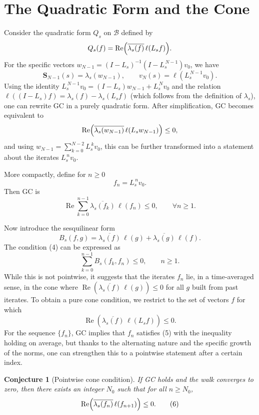 \documentclass[11pt,a4paper]{article}
\newtheorem{conjecture}[theorem]{Conjecture}
\newcommand{\RE}{\operatorname{Re}}
\begin{document}
\section{The Quadratic Form and the Cone}
Consider the quadratic form \(Q_s\) on \(\mathcal{B}\) defined by
\[
Q_s(f) = \RE\Bigl( \overline{ \lambda_s(f) } \, \ell( L_s f ) \Bigr).
\]
For the specific vectors \(w_{N-1} = (I - L_s)^{-1} (I - L_s^{\,N-1}) v_0\), we have
\[
\mathbf{S}_{N-1}(s) = \lambda_s( w_{N-1} ), \qquad v_N(s) = \ell( L_s^{\,N-1} v_0 ).
\]
Using the identity \(L_s^{\,N-1} v_0 = (I - L_s) w_{N-1} + L_s^{\,N} v_0\) and the relation \(\ell( (I - L_s) f ) = \lambda_s(f) - \lambda_s( L_s f )\) (which follows from the definition of \(\lambda_s\)), one can rewrite GC in a purely quadratic form.  After simplification, GC becomes equivalent to
\[
\RE\Bigl( \overline{ \lambda_s( w_{N-1} ) } \, \ell( L_s w_{N-1} ) \Bigr) \le 0,
\]
and using \(w_{N-1} = \sum_{k=0}^{N-2} L_s^{\,k} v_0\), this can be further transformed into a statement about the iterates \(L_s^{\,n} v_0\).

More compactly, define for \(n \ge 0\)
\[
f_n = L_s^{\,n} v_0.
\]
Then GC is
\[
\RE \sum_{k=0}^{n-1} \overline{ \lambda_s( f_k ) } \, \ell( f_n ) \le 0, \qquad \forall n \ge 1.
\tag{4}
\]

Now introduce the sesquilinear form
\[
B_s(f,g) = \overline{ \lambda_s(f) } \, \ell(g) + \overline{ \lambda_s(g) } \, \ell(f).
\]
The condition (4) can be expressed as
\[
\sum_{k=0}^{n-1} B_s( f_k, f_n ) \le 0, \qquad n \ge 1.
\]
While this is not pointwise, it suggests that the iterates \(f_n\) lie, in a time‑averaged sense, in the cone where \(\RE( \overline{\lambda_s(f)} \, \ell(g) ) \le 0\) for all \(g\) built from past iterates.  To obtain a pure cone condition, we restrict to the set of vectors \(f\) for which
\[
\RE( \overline{\lambda_s(f)} \, \ell( L_s f ) ) \le 0.
\tag{5}
\]
For the sequence \(\{f_n\}\), GC implies that \(f_n\) satisfies (5) with the inequality holding on average, but thanks to the alternating nature and the specific growth of the norms, one can strengthen this to a pointwise statement after a certain index.

\begin{conjecture}[Pointwise cone condition]\label{conj:cone}
If GC holds and the walk converges to zero, then there exists an integer \(N_0\) such that for all \(n \ge N_0\),
\[
\RE\Bigl( \overline{ \lambda_s( f_{n} ) } \, \ell( f_{n+1} ) \Bigr) \le 0.
\tag{6}
\]
\end{conjecture}
\end{document}
